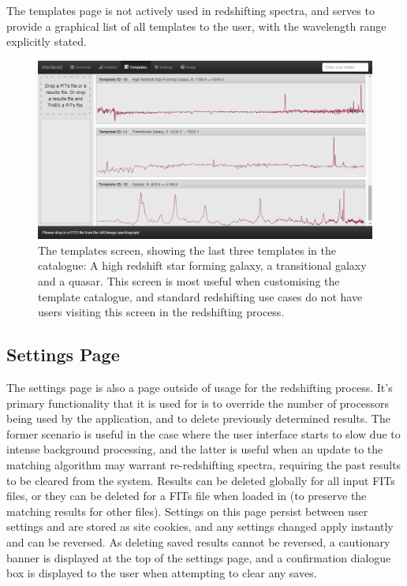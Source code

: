 \documentclass[titlesmallcaps, examinerscopy, copyrightpage]{uqthesis}
\begin{document}
The templates page is not actively used in redshifting spectra, and serves to provide a graphical list of all templates to the user, with the wavelength range explicitly stated. 


\begin{figure}[ht!]
\includegraphics[width=1\textwidth]{images/templates.png} 
\centering
\caption{The templates screen, showing the last three templates in the catalogue: A high redshift star forming galaxy, a transitional galaxy and a quasar. This screen is most useful when customising the template catalogue, and standard redshifting use cases do not have users visiting this screen in the redshifting process.}
\label{fig:templates}
\end{figure}



\subsection{Settings Page}

The settings page is also a page outside of usage for the redshifting process. It's primary functionality that it is used for is to override the number of processors being used by the application, and to delete previously determined results. The former scenario is useful in the case where the user interface starts to slow due to intense background processing, and the latter is useful when an update to the matching algorithm may warrant re-redshifting spectra, requiring the past results to be cleared from the system. Results can be deleted globally for all input FITs files, or they can be deleted for a FITs file when loaded in (to preserve the matching results for other files). Settings on this page persist between user settings and are stored as site cookies, and any settings changed apply instantly and can be reversed. As deleting saved results cannot be reversed, a cautionary banner is displayed at the top of the settings page, and a confirmation dialogue box is displayed to the user when attempting to clear any saves.
\end{document}
